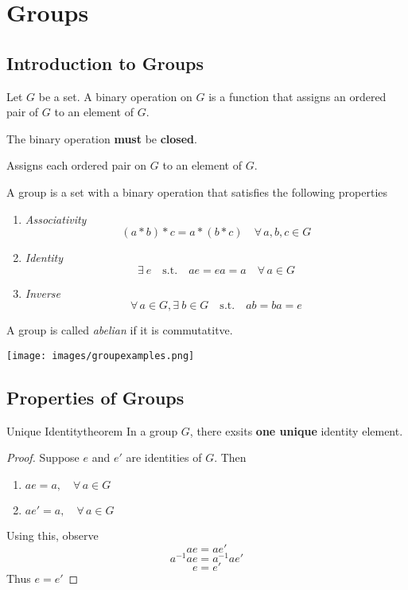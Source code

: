 \documentclass{report}
\let\oldforall\forall
\renewcommand{\forall}{\oldforall \, }
\let\oldexist\exists
\renewcommand{\exists}{\oldexist \: }
\newcommand{\st}{\quad \mathrm{s.t.} \quad}
\begin{document}
\tableofcontents

\chapter{Groups}
\section{Introduction to Groups}

\begin{tcolorbox}[title=Binary Operation]
  Let $G$ be a set. A binary operation on $G$ is a function that 
  assigns an ordered pair of $G$ to an element of $G$.

  The binary operation \textbf{must} be \textbf{closed}.

  Assigns each ordered pair on $G$ to an element of $G$.
\end{tcolorbox}

\begin{tcolorbox}[title=Group]
A group is a set with a binary operation that satisfies the following properties

  \begin{enumerate}
    \item \em{Associativity}
    \[ (a * b) * c = a * (b * c) \quad \forall a, b, c \in G \]
    \item \em{Identity}
    \[ \exists e \st ae = ea = a \quad \forall a \in G \]
    \item \em{Inverse}
    \[ \forall a \in G, \exists b \in G \st ab = ba = e\]
  \end{enumerate}
\end{tcolorbox}

A group is called \textit{abelian} if it is commutatitve.

\begin{center}
  \texttt{[image: images/groupexamples.png]}
\end{center}

\section{Properties of Groups}

\begin{theo}[colback=red!5!white,colframe=red!50!black]{Unique Identity}{theorem}
In a group $G$, there exsits \textbf{one unique} identity element.
\end{theo}

\begin{proof}
  Suppose $e$ and $e'$ are identities of $G$. Then
  \begin{enumerate}
    \item $ae = a, \quad \forall a \in G$
    \item $ae' = a, \quad \forall a \in G$
  \end{enumerate}
  Using this, observe
  \[ ae = ae' \]
  \[ a^{-1}ae = a^{-1}ae' \]
  \[ e = e' \]
  Thus $e = e'$
\end{proof}
\end{document}

